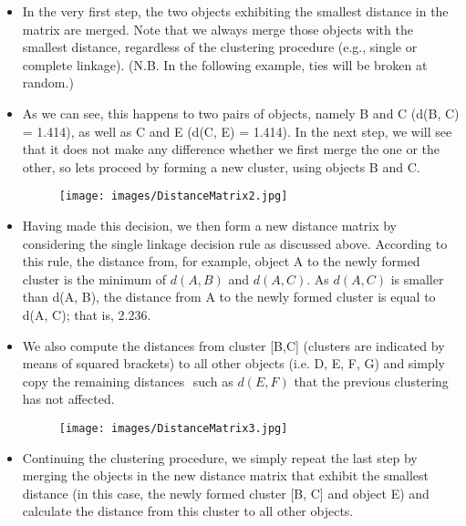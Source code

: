 \documentclass[a4paper,12pt]{article}
\begin{document}
\begin{itemize}
	\item In the very first step, the two
	objects exhibiting the smallest distance in the matrix are merged. Note that we
	always merge those objects with the smallest distance, regardless of the clustering
	procedure (e.g., single or complete linkage). (N.B. In the following example, ties will be broken at random.)
	\item As we can see, this happens to two
	pairs of objects, namely B and C (d(B, C) = 1.414), as well as C and E (d(C, E) =
	1.414). In the next step, we will see that it does not make any difference whether we
	first merge the one or the other, so lets proceed by forming a new cluster, using
	objects B and C.
	\begin{figure}[h!]
		\begin{center}
			\texttt{[image: images/DistanceMatrix2.jpg]}\\
		\end{center}
	\end{figure}
	\item Having made this decision, we then form a new distance matrix by considering
	the single linkage decision rule as discussed above. According to this rule, the
	distance from, for example, object A to the newly formed cluster is the minimum of
	$d(A, B)$ and $d(A, C)$. As $d(A, C)$ is smaller than d(A, B), the distance from A to the
	newly formed cluster is equal to d(A, C); that is, 2.236.
	\item We also compute the
	distances from cluster [B,C] (clusters are indicated by means of squared brackets)
	to all other objects (i.e. D, E, F, G) and simply copy the remaining distances  such
	as $d(E, F)$  that the previous clustering has not affected.
	\begin{figure}[h!]
		\begin{center}
			\texttt{[image: images/DistanceMatrix3.jpg]}\\
		\end{center}
	\end{figure}
	\item Continuing the clustering procedure, we simply repeat the last step by merging
	the objects in the new distance matrix that exhibit the smallest distance (in this case,
	the newly formed cluster [B, C] and object E) and calculate the distance from this
	cluster to all other objects.
	\begin{figure}[h!]

\end{figure}
\end{itemize}
\end{document}
